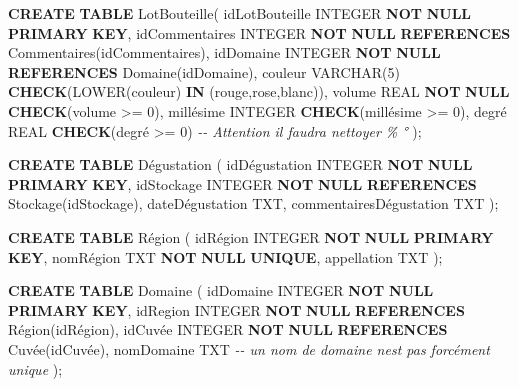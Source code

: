 \documentclass[11pt]{article}
\newenvironment{Shaded}{}{}
\newcommand{\KeywordTok}[1]{\textcolor[rgb]{0.00,0.44,0.13}{\textbf{{#1}}}}
\newcommand{\DataTypeTok}[1]{\textcolor[rgb]{0.56,0.13,0.00}{{#1}}}
\newcommand{\DecValTok}[1]{\textcolor[rgb]{0.25,0.63,0.44}{{#1}}}
\newcommand{\StringTok}[1]{\textcolor[rgb]{0.25,0.44,0.63}{{#1}}}
\newcommand{\CommentTok}[1]{\textcolor[rgb]{0.38,0.63,0.69}{\textit{{#1}}}}
\newcommand{\FunctionTok}[1]{\textcolor[rgb]{0.02,0.16,0.49}{{#1}}}
\newcommand{\NormalTok}[1]{{#1}}
\newcommand{\OperatorTok}[1]{\textcolor[rgb]{0.40,0.40,0.40}{{#1}}}
\begin{document}
\begin{Shaded}
\begin{Highlighting}[]
\KeywordTok{CREATE} \KeywordTok{TABLE}\NormalTok{ LotBouteille(}
\NormalTok{    idLotBouteille }\DataTypeTok{INTEGER} \KeywordTok{NOT} \KeywordTok{NULL} \KeywordTok{PRIMARY} \KeywordTok{KEY}\NormalTok{,}
\NormalTok{    idCommentaires }\DataTypeTok{INTEGER} \KeywordTok{NOT} \KeywordTok{NULL} \KeywordTok{REFERENCES}\NormalTok{ Commentaires(idCommentaires),}
\NormalTok{    idDomaine }\DataTypeTok{INTEGER} \KeywordTok{NOT} \KeywordTok{NULL} \KeywordTok{REFERENCES}\NormalTok{ Domaine(idDomaine),}
\NormalTok{    couleur }\DataTypeTok{VARCHAR}\NormalTok{(}\DecValTok{5}\NormalTok{) }\KeywordTok{CHECK}\NormalTok{(}\FunctionTok{LOWER}\NormalTok{(couleur) }\KeywordTok{IN}\NormalTok{ (}\StringTok{\textquotesingle{}rouge\textquotesingle{}}\NormalTok{,}\StringTok{\textquotesingle{}rose\textquotesingle{}}\NormalTok{,}\StringTok{\textquotesingle{}blanc\textquotesingle{}}\NormalTok{)),}
\NormalTok{    volume }\DataTypeTok{REAL} \KeywordTok{NOT} \KeywordTok{NULL} \KeywordTok{CHECK}\NormalTok{(volume }\OperatorTok{>=} \DecValTok{0}\NormalTok{),}
\NormalTok{    millésime }\DataTypeTok{INTEGER} \KeywordTok{CHECK}\NormalTok{(millésime }\OperatorTok{>=} \DecValTok{0}\NormalTok{),}
\NormalTok{    degré }\DataTypeTok{REAL} \KeywordTok{CHECK}\NormalTok{(degré }\OperatorTok{>=} \DecValTok{0}\NormalTok{)  }\CommentTok{{-}{-} Attention il faudra nettoyer \% °}
\NormalTok{    );}

\KeywordTok{CREATE} \KeywordTok{TABLE}\NormalTok{ Dégustation (}
\NormalTok{    idDégustation }\DataTypeTok{INTEGER} \KeywordTok{NOT} \KeywordTok{NULL} \KeywordTok{PRIMARY} \KeywordTok{KEY}\NormalTok{,}
\NormalTok{    idStockage }\DataTypeTok{INTEGER} \KeywordTok{NOT} \KeywordTok{NULL} \KeywordTok{REFERENCES}\NormalTok{ Stockage(idStockage),}
\NormalTok{    dateDégustation TXT,}
\NormalTok{    commentairesDégustation TXT }
\NormalTok{    );}

\KeywordTok{CREATE} \KeywordTok{TABLE}\NormalTok{ Région (}
\NormalTok{    idRégion }\DataTypeTok{INTEGER} \KeywordTok{NOT} \KeywordTok{NULL} \KeywordTok{PRIMARY} \KeywordTok{KEY}\NormalTok{,}
\NormalTok{    nomRégion TXT }\KeywordTok{NOT} \KeywordTok{NULL} \KeywordTok{UNIQUE}\NormalTok{,}
\NormalTok{    appellation TXT}
\NormalTok{    );}

\KeywordTok{CREATE} \KeywordTok{TABLE}\NormalTok{ Domaine (}
\NormalTok{    idDomaine }\DataTypeTok{INTEGER} \KeywordTok{NOT} \KeywordTok{NULL} \KeywordTok{PRIMARY} \KeywordTok{KEY}\NormalTok{,}
\NormalTok{    idRegion }\DataTypeTok{INTEGER} \KeywordTok{NOT} \KeywordTok{NULL} \KeywordTok{REFERENCES}\NormalTok{ Région(idRégion),}
\NormalTok{    idCuvée }\DataTypeTok{INTEGER} \KeywordTok{NOT} \KeywordTok{NULL} \KeywordTok{REFERENCES}\NormalTok{ Cuvée(idCuvée),}
\NormalTok{    nomDomaine TXT    }\CommentTok{{-}{-} un nom de domaine n\textquotesingle{}est pas forcément unique }
\NormalTok{    );}


\end{Highlighting}
\end{Shaded}
\end{document}
